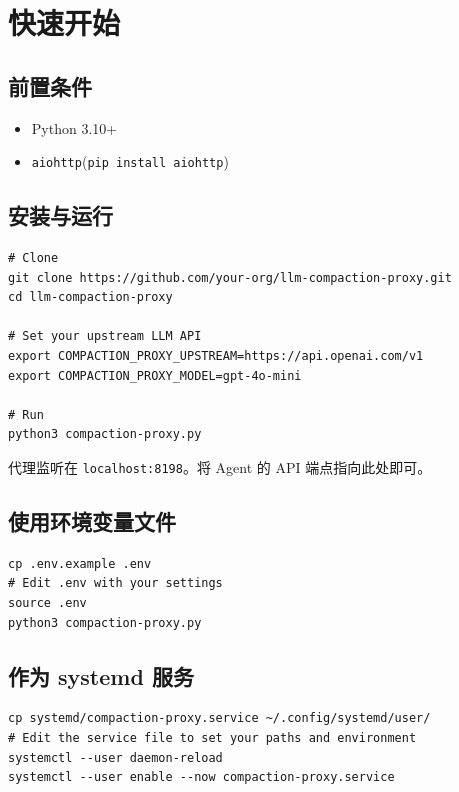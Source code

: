 \documentclass[11pt,a4paper]{article}
\begin{document}
\section{快速开始}

\subsection{前置条件}

\begin{itemize}
  \item Python 3.10+
  \item \texttt{aiohttp}(\texttt{pip install aiohttp})
\end{itemize}

\subsection{安装与运行}

\begin{lstlisting}
# Clone
git clone https://github.com/your-org/llm-compaction-proxy.git
cd llm-compaction-proxy

# Set your upstream LLM API
export COMPACTION_PROXY_UPSTREAM=https://api.openai.com/v1
export COMPACTION_PROXY_MODEL=gpt-4o-mini

# Run
python3 compaction-proxy.py
\end{lstlisting}

代理监听在 \texttt{localhost:8198}。将 Agent 的 API 端点指向此处即可。

\subsection{使用环境变量文件}

\begin{lstlisting}
cp .env.example .env
# Edit .env with your settings
source .env
python3 compaction-proxy.py
\end{lstlisting}

\subsection{作为 systemd 服务}

\begin{lstlisting}
cp systemd/compaction-proxy.service ~/.config/systemd/user/
# Edit the service file to set your paths and environment
systemctl --user daemon-reload
systemctl --user enable --now compaction-proxy.service
\end{lstlisting}
\end{document}
